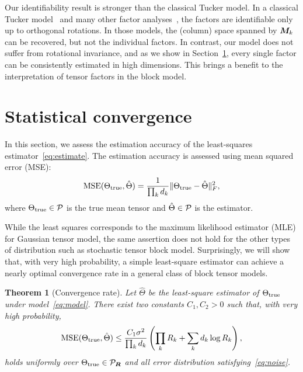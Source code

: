 \documentclass{article}
\newtheorem{theorem}{Theorem}
\begin{document}
Our identifiability result is stronger than the classical Tucker model. In a classical Tucker model~\cite{zhang2018tensor,kolda2009tensor} and many other factor analyses~\cite{darton1980rotation,abdi2003factor}, the factors are identifiable only up to orthogonal rotations. In those models, the (column) space spanned by $\bm M_k$ can be recovered, but not the individual factors. In contrast, our model does not suffer from rotational invariance, and as we show in Section~\ref{sec:theory}, every single factor can be consistently estimated in high dimensions. This brings a benefit to the interpretation of tensor factors in the block model.  



\section{Statistical convergence}\label{sec:theory}
In this section, we assess the estimation accuracy of the least-squares estimator~\eqref{eq:estimate}. The estimation accuracy is assessed using mean squared error (MSE):
\begin{equation}\label{eq:MSE}
\text{MSE}(\Theta_{\text{true}},\hat \Theta)={1\over \prod_k d_k}\lVert\Theta_{\text{true}}-\hat \Theta\rVert_F^2,
\end{equation}
where $\Theta_{\text{true}}\in\mathcal{P}$ is the true mean tensor and $\hat \Theta\in\mathcal{P}$ is the estimator. 

While the least squares corresponds to the maximum likelihood estimator (MLE) for Gaussian tensor model, the same assertion does not hold for the other types of distribution such as stochastic tensor block model. Surprisingly, we will show that, with very high probability, a simple least-square estimator can achieve a nearly optimal convergence rate in a general class of block tensor models.  


\begin{theorem}[Convergence rate] \label{thm:main}
Let $\hat \Theta$ be the least-square estimator of $\Theta_{\text{true}}$ under model~\eqref{eq:model}. There exist two constants $C_1, C_2>0$ such that, with very high probability,  
\begin{equation}\label{eq:bound}
\text{MSE}(\Theta_{\text{true}},\hat \Theta)\leq {C_1 \sigma^2\over  \prod_k d_k} \left(\prod_k R_k+\sum_k d_k \log R_k\right),
\end{equation}
holds uniformly over $\Theta_{\text{true}}\in\mathcal{P}_{\bm{R}}$ and all error distribution satisfying~\eqref{eq:noise}. 
\end{theorem}
\end{document}
